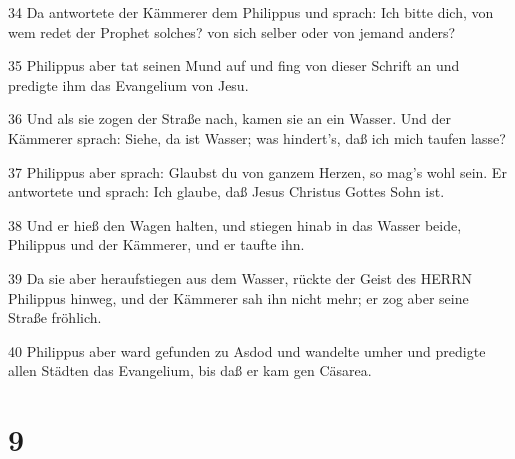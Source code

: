 \par 34 Da antwortete der Kämmerer dem Philippus und sprach: Ich bitte dich, von wem redet der Prophet solches? von sich selber oder von jemand anders?
\par 35 Philippus aber tat seinen Mund auf und fing von dieser Schrift an und predigte ihm das Evangelium von Jesu.
\par 36 Und als sie zogen der Straße nach, kamen sie an ein Wasser. Und der Kämmerer sprach: Siehe, da ist Wasser; was hindert's, daß ich mich taufen lasse?
\par 37 Philippus aber sprach: Glaubst du von ganzem Herzen, so mag's wohl sein. Er antwortete und sprach: Ich glaube, daß Jesus Christus Gottes Sohn ist.
\par 38 Und er hieß den Wagen halten, und stiegen hinab in das Wasser beide, Philippus und der Kämmerer, und er taufte ihn.
\par 39 Da sie aber heraufstiegen aus dem Wasser, rückte der Geist des HERRN Philippus hinweg, und der Kämmerer sah ihn nicht mehr; er zog aber seine Straße fröhlich.
\par 40 Philippus aber ward gefunden zu Asdod und wandelte umher und predigte allen Städten das Evangelium, bis daß er kam gen Cäsarea.

\chapter{9}

